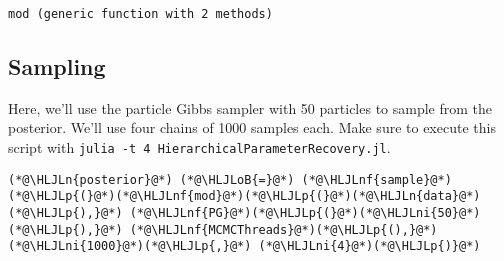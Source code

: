 \documentclass[12pt,a4paper]{article}
\newcommand{\HLJLn}[1]{#1}
\newcommand{\HLJLnf}[1]{\textcolor[RGB]{66,102,213}{#1}}
\newcommand{\HLJLni}[1]{\textcolor[RGB]{59,151,46}{#1}}
\newcommand{\HLJLoB}[1]{\textcolor[RGB]{102,102,102}{\textbf{#1}}}
\newcommand{\HLJLp}[1]{#1}
\begin{document}
\begin{lstlisting}
mod (generic function with 2 methods)
\end{lstlisting}


\subsection{Sampling}
Here, we'll use the particle Gibbs sampler with 50 particles to sample from the posterior. We'll use four chains of 1000 samples each. Make sure to execute this script with \texttt{julia -t 4 HierarchicalParameterRecovery.jl}.


\begin{lstlisting}
(*@\HLJLn{posterior}@*) (*@\HLJLoB{=}@*) (*@\HLJLnf{sample}@*)(*@\HLJLp{(}@*)(*@\HLJLnf{mod}@*)(*@\HLJLp{(}@*)(*@\HLJLn{data}@*)(*@\HLJLp{),}@*) (*@\HLJLnf{PG}@*)(*@\HLJLp{(}@*)(*@\HLJLni{50}@*)(*@\HLJLp{),}@*) (*@\HLJLnf{MCMCThreads}@*)(*@\HLJLp{(),}@*) (*@\HLJLni{1000}@*)(*@\HLJLp{,}@*) (*@\HLJLni{4}@*)(*@\HLJLp{)}@*)
\end{lstlisting}
\end{document}
